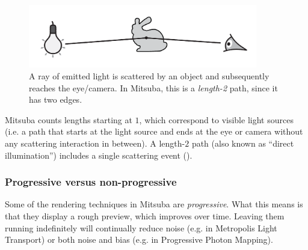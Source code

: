 \begin{figure}[h!]
\centering
\vspace{-5mm}
\includegraphics[width=10cm]{images/path_explanation.pdf}
\vspace{-5mm}
\caption{
	\label{fig:path-explanation}
	A ray of emitted light is scattered by an object and subsequently 
	reaches the eye/camera.
	In Mitsuba, this is a \emph{length-2} path, since it has two edges.
}
\end{figure}
Mitsuba counts lengths starting at $1$, which correspond to
visible light sources (i.e. a path that starts at the light 
source and ends at the eye or camera without any scattering 
interaction in between).
A length-$2$ path (also known as ``direct illumination'') includes
a single scattering event ().

\subsubsection*{Progressive versus non-progressive}
Some of the rendering techniques in Mitsuba are \emph{progressive}.
What this means is that they display a rough preview, which
improves over time. Leaving them running indefinitely will
continually reduce noise (e.g. in Metropolis Light Transport)
or both noise and bias (e.g. in Progressive Photon Mapping).

